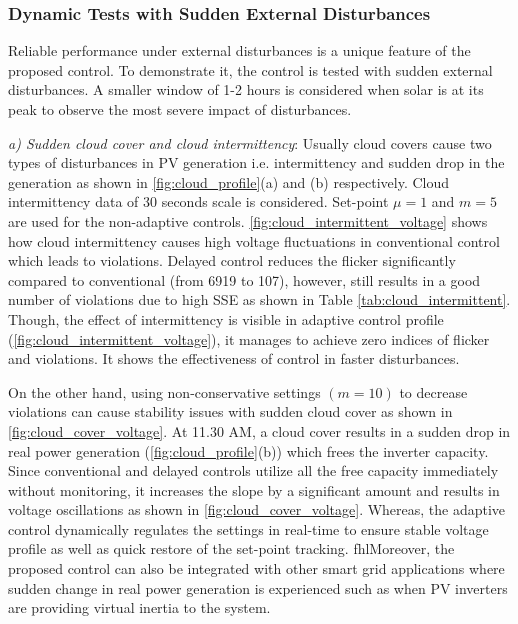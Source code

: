 \documentclass[journal]{IEEEtran}
\begin{document}
\subsubsection{Dynamic Tests with Sudden External Disturbances}
Reliable performance under external disturbances is a unique feature of the proposed control. To demonstrate it, the control is tested with sudden external disturbances. A smaller window of 1-2 hours is considered when solar is at its peak to observe the most severe impact of disturbances.

\textit{a) Sudden cloud cover and cloud intermittency}: Usually cloud covers cause two types of disturbances in PV generation i.e. intermittency and sudden drop in the generation as shown in \figurename \ref{fig:cloud_profile}(a) and (b) respectively. Cloud intermittency data of 30 seconds scale is considered. Set-point $\mu=1$ and $m=5$ are used for the non-adaptive controls. \figurename \ref{fig:cloud_intermittent_voltage} shows how cloud intermittency causes high voltage fluctuations in conventional control which leads to violations. Delayed control reduces the flicker significantly compared to conventional (from 6919 to 107), however, still results in a good number of violations due to high SSE as shown in Table \ref{tab:cloud_intermittent}. Though, the effect of intermittency is visible in adaptive control profile (\figurename \ref{fig:cloud_intermittent_voltage}), it manages to achieve zero indices of flicker and violations. It shows the effectiveness of control in faster disturbances.

On the other hand, using non-conservative settings $(m=10)$ to decrease violations can cause stability issues with sudden cloud cover as shown in \figurename \ref{fig:cloud_cover_voltage}. At 11.30 AM, a cloud cover results in a sudden drop in real power generation (\figurename \ref{fig:cloud_profile}(b)) which frees the inverter capacity. Since conventional and delayed controls utilize all the free capacity immediately without monitoring, it increases the slope by a significant amount and results in voltage oscillations as shown in  \figurename \ref{fig:cloud_cover_voltage}. Whereas, the adaptive control dynamically regulates the  settings in real-time to ensure stable voltage profile as well as quick restore of the set-point tracking. fhl{Moreover, the proposed control can also be integrated with other smart grid applications where sudden change in real power generation is experienced such as when PV inverters are providing virtual inertia to the system.} 
\end{document}
